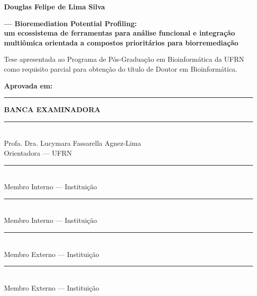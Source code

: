 \thispagestyle{empty}
\begin{center}
\textbf{Douglas Felipe de Lima Silva}
\vspace{1cm}

\textbf{\biorempp{} --- Bioremediation Potential Profiling:} \\
\textbf{um ecossistema de ferramentas para análise funcional e integração multiômica orientada a compostos prioritários para biorremediação}
\vspace{1cm}

\begin{flushright}
\begin{minipage}{0.6\textwidth}
Tese apresentada ao Programa de Pós-Graduação em Bioinformática da UFRN como requisito parcial para obtenção do título de Doutor em Bioinformática.
\end{minipage}
\end{flushright}
\vspace{0.5cm}

\textbf{Aprovada em:} \rule{4cm}{0.4pt}
\vspace{2cm}

\textbf{BANCA EXAMINADORA}
\vspace{1.5cm}

\rule{10cm}{0.4pt} \\
Profa. Dra. Lucymara Fassarella Agnez-Lima \\
Orientadora --- UFRN
\vspace{1cm}

\rule{10cm}{0.4pt} \\
{Membro Interno --- Instituição}
\vspace{1cm}

\rule{10cm}{0.4pt} \\
{Membro Interno --- Instituição}
\vspace{1cm}

\rule{10cm}{0.4pt} \\
{Membro Externo --- Instituição}
\vspace{1cm}

\rule{10cm}{0.4pt} \\
{Membro Externo --- Instituição}
\end{center}
\newpage

